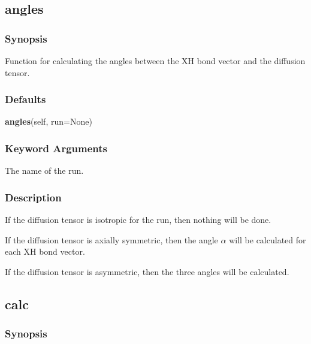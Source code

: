

\newpage

\subsection{angles}


\subsubsection{Synopsis}

Function for calculating the angles between the XH bond vector and the diffusion tensor.

\subsubsection{Defaults}

\textsf{\textbf{angles}(self, run=None)}


\subsubsection{Keyword Arguments}


  The name of the run.

\subsubsection{Description}

If the diffusion tensor  is isotropic  for the run, then nothing will be done.

If the diffusion tensor  is axially symmetric,  then the angle  $\alpha$ will be calculated for
each XH bond vector.

If the diffusion tensor  is asymmetric,  then the three angles  will be calculated.


\newpage

\subsection{calc}


\subsubsection{Synopsis}

